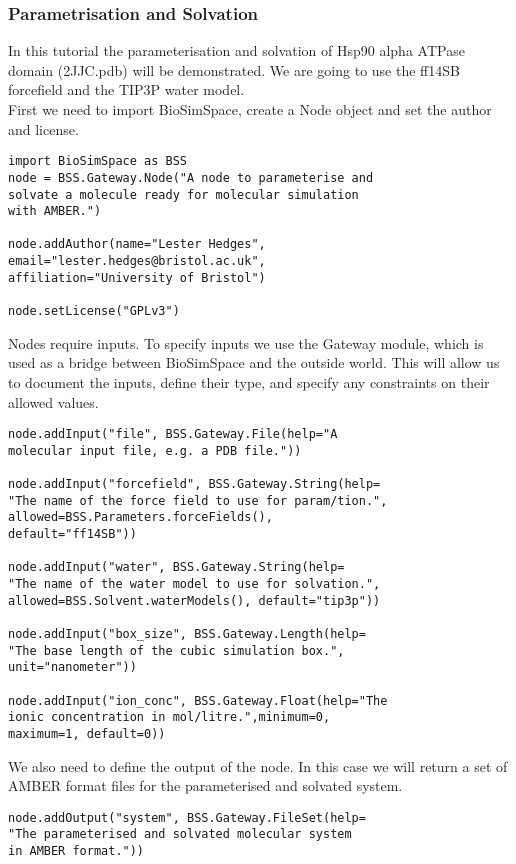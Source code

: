 \documentclass[9pt,tutorial]{livecoms}
\begin{document}
\subsubsection{Parametrisation and Solvation}
In this tutorial the parameterisation and solvation of Hsp90 alpha ATPase domain (2JJC.pdb) will be demonstrated. We are going to use the ff14SB forcefield and the TIP3P water model. \\

First we need to import BioSimSpace, create a Node object and set the author and license. 

\begin{verbatim}
import BioSimSpace as BSS
node = BSS.Gateway.Node("A node to parameterise and 
solvate a molecule ready for molecular simulation
with AMBER.")

node.addAuthor(name="Lester Hedges", 
email="lester.hedges@bristol.ac.uk", 
affiliation="University of Bristol")

node.setLicense("GPLv3")
\end{verbatim}
Nodes require inputs. To specify inputs we use the Gateway module, which is used as a bridge between BioSimSpace and the outside world. This will allow us to document the inputs, define their type, and specify any constraints on their allowed values.
\begin{verbatim}
node.addInput("file", BSS.Gateway.File(help="A 
molecular input file, e.g. a PDB file."))

node.addInput("forcefield", BSS.Gateway.String(help=
"The name of the force field to use for param/tion.",
allowed=BSS.Parameters.forceFields(),
default="ff14SB"))
 
node.addInput("water", BSS.Gateway.String(help=
"The name of the water model to use for solvation.", 
allowed=BSS.Solvent.waterModels(), default="tip3p"))

node.addInput("box_size", BSS.Gateway.Length(help=
"The base length of the cubic simulation box.",
unit="nanometer"))

node.addInput("ion_conc", BSS.Gateway.Float(help="The
ionic concentration in mol/litre.",minimum=0, 
maximum=1, default=0))
\end{verbatim}

We also need to define the output of the node. In this case we will return a set of AMBER format files for the parameterised and solvated system.

\begin{verbatim}
node.addOutput("system", BSS.Gateway.FileSet(help=
"The parameterised and solvated molecular system 
in AMBER format."))
\end{verbatim}
\end{document}
